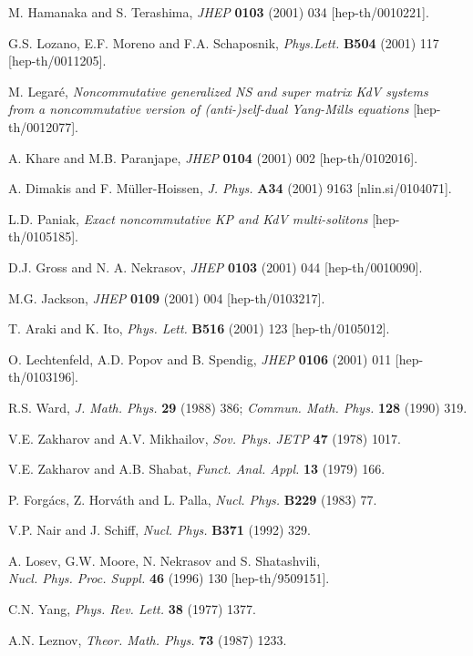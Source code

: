 \documentclass[a4paper,11pt]{article}
\numberwithin{equation}{section}
\begin{document}
\begin{thebibliography}{99}
M. Hamanaka and S. Terashima,
{\sl JHEP} {\bf 0103} (2001) 034 [hep-th/0010221].

G.S. Lozano, E.F. Moreno and F.A. Schaposnik,
{\sl Phys.Lett.} {\bf B504} (2001) 117 [hep-th/0011205].

M. Legar\'e,
{\it Noncommutative generalized NS and super matrix KdV systems \\
from a noncommutative version of (anti-)self-dual Yang-Mills equations}
[hep-th/0012077].

A. Khare and M.B. Paranjape,
{\sl JHEP} {\bf 0104} (2001) 002 [hep-th/0102016].

A. Dimakis and F. M\"uller-Hoissen,
{\sl J. Phys.} {\bf A34} (2001) 9163 
[nlin.si/0104071].

L.D. Paniak,
{\it Exact noncommutative KP and KdV multi-solitons}
[hep-th/0105185].

D.J. Gross and N. A. Nekrasov,
{\sl JHEP} {\bf 0103} (2001) 044 [hep-th/0010090].

M.G. Jackson,
{\sl JHEP} {\bf 0109} (2001) 004 
[hep-th/0103217].

T. Araki and K. Ito,
{\sl Phys. Lett.} {\bf B516} (2001) 123 
[hep-th/0105012].

O. Lechtenfeld, A.D. Popov and B. Spendig,
{\sl JHEP} {\bf 0106} (2001) 011 [hep-th/0103196].

R.S. Ward,
{\sl J. Math. Phys.} {\bf 29} (1988) 386;
{\sl Commun. Math. Phys.} {\bf 128} (1990) 319.

V.E. Zakharov and A.V. Mikhailov,
{\sl Sov. Phys. JETP} {\bf 47} (1978) 1017.

V.E. Zakharov and A.B. Shabat,
{\sl Funct. Anal. Appl.} {\bf 13} (1979) 166.

P. Forg\'acs, Z. Horv\'ath and L. Palla,
{\sl Nucl. Phys.} {\bf B229} (1983) 77.

V.P. Nair and J. Schiff,
{\sl Nucl. Phys.} {\bf B371} (1992) 329.

A. Losev, G.W. Moore, N. Nekrasov and S. Shatashvili,\\
{\sl Nucl. Phys. Proc. Suppl.} {\bf 46} (1996) 130 [hep-th/9509151].

C.N. Yang,
{\sl Phys. Rev. Lett.} {\bf 38} (1977) 1377.

A.N. Leznov,
{\sl Theor. Math. Phys.} {\bf 73} (1987) 1233.


\end{thebibliography}
\end{document}

